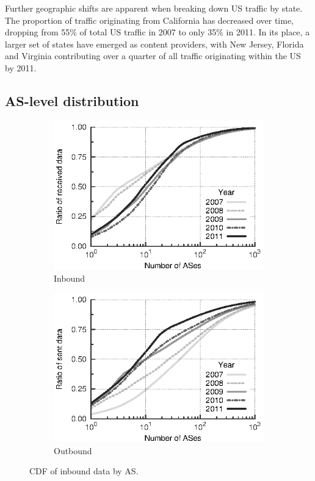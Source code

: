 Further geographic shifts are apparent when breaking down US traffic by state.
The proportion of traffic originating from California has decreased over time, dropping from 55\% of total US traffic in 2007 to only 35\% in 2011.
In its place, a larger set of states have emerged as content providers, with New Jersey, Florida and Virginia contributing over a quarter of all traffic originating within the US by 2011.

\subsection{\acs{AS}-level distribution}

\begin{figure}
    \centering
    \begin{subfigure}[b]{0.5\linewidth}
        \includegraphics{figures/malawi/asn_cdf_in}
        \caption{Inbound}
    \end{subfigure}%
    \begin{subfigure}[b]{0.5\linewidth}
        \includegraphics{figures/malawi/asn_cdf_out}
        \caption{Outbound}
    \end{subfigure}%
    \caption{CDF of inbound data by AS. \label{fig:ecdf_asn_from}}
\end{figure}


